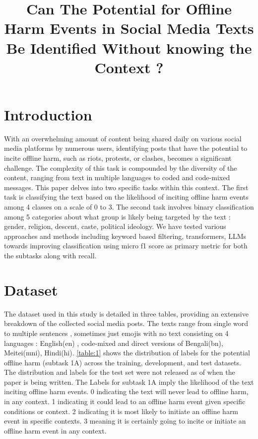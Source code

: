 \documentclass[10pt, a4paper]{article}
\title{Can The Potential for Offline Harm Events in Social Media Texts Be Identified Without knowing the Context ?}
\begin{document}
\maketitleabstract
\section{Introduction}
\label{sec:intro}
With an overwhelming amount of content being shared daily on various social media platforms by numerous users, identifying posts that have the potential to incite offline harm, such as riots, protests, or clashes, becomes a significant challenge. The complexity of this task is compounded by the diversity of the content, ranging from text in multiple languages to coded and code-mixed messages. This paper delves into two specific tasks within this context. The first task is classifying the text based on the likelihood of inciting  offline harm events among 4 classes on a scale of 0 to 3. The second task involves binary classification among 5 categories about what group is likely being targeted by the text : gender, religion, descent, caste, political ideology. We have tested various approaches and methods including keyword based filtering, transformers, LLMs towards improving classification using micro f1 score as primary metric for both the subtasks along with recall.

\section{Dataset}
\label{sec:dataset}

The dataset \citep{kumar2024harmpot} used in this study is detailed in three tables, providing an extensive breakdown of the collected social media posts. The texts range from single word to multiple sentences , sometimes just emojis with no text consisting on 4 languages : English(en) , code-mixed and direct versions of Bengali(bn), Meitei(mni), Hindi(hi). \autoref{table:1} shows the distribution of labels for the potential offline harm (subtask 1A) across the training, development, and test datasets. The distribution and labels for the test set were not released as of when the paper is being written. The Labels for subtask 1A imply the likelihood of the text inciting offline harm events. 0 indicating the text will never lead to offline harm, in any context. 1 indicating it could lead to an offline harm event given specific conditions or context. 2 indicating it is most likely to initiate an offline harm event in specific contexts. 3 meaning it is certainly going to incite or initiate an offline harm event in any context.
\end{document}
